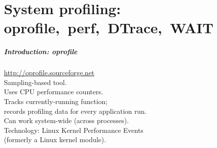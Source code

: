

\part{System profiling: oprofile,~perf,~DTrace,~WAIT}
\frame{\partpage}

\begin{frame}
  \frametitle{Introduction: oprofile}

\large
\begin{changemargin}{1.5cm}

    \url{http://oprofile.sourceforge.net}\\[1em]

    Sampling-based tool.\\[1em]
    
    Uses CPU performance counters.\\[1em]

    Tracks currently-running function;\\
    records profiling data for every application run.\\[1em]

    Can work system-wide (across processes).\\[1em]

    Technology: Linux Kernel Performance Events\\ (formerly a Linux kernel module).
    \end{changemargin}
\end{frame}

